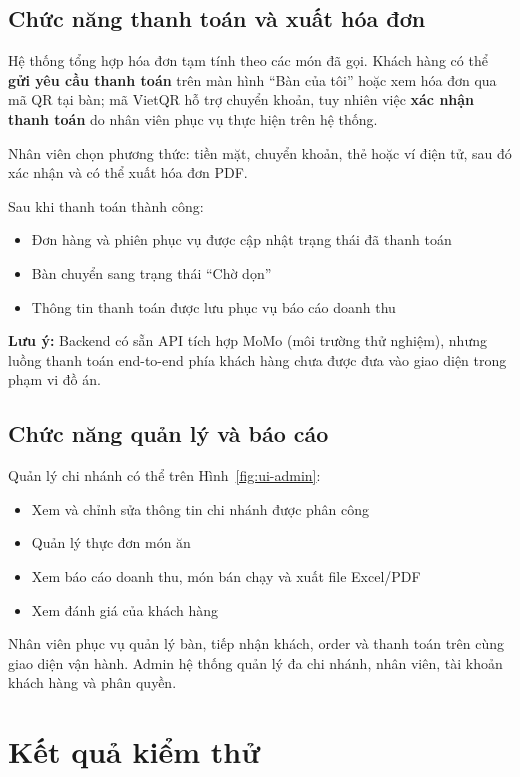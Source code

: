 \documentclass[../DoAn.tex]{subfiles}
\begin{document}
\subsection{Chức năng thanh toán và xuất hóa đơn}

Hệ thống tổng hợp hóa đơn tạm tính theo các món đã gọi.
Khách hàng có thể \textbf{gửi yêu cầu thanh toán} trên màn hình ``Bàn của tôi'' hoặc xem hóa đơn qua mã QR tại bàn; mã VietQR hỗ trợ chuyển khoản, tuy nhiên việc \textbf{xác nhận thanh toán} do nhân viên phục vụ thực hiện trên hệ thống.

Nhân viên chọn phương thức: tiền mặt, chuyển khoản, thẻ hoặc ví điện tử, sau đó xác nhận và có thể xuất hóa đơn PDF.

Sau khi thanh toán thành công:
\begin{itemize}
    \item Đơn hàng và phiên phục vụ được cập nhật trạng thái đã thanh toán
    \item Bàn chuyển sang trạng thái ``Chờ dọn''
    \item Thông tin thanh toán được lưu phục vụ báo cáo doanh thu
\end{itemize}

\textbf{Lưu ý:} Backend có sẵn API tích hợp MoMo (môi trường thử nghiệm), nhưng luồng thanh toán end-to-end phía khách hàng chưa được đưa vào giao diện trong phạm vi đồ án.

\subsection{Chức năng quản lý và báo cáo}

Quản lý chi nhánh có thể trên Hình~\ref{fig:ui-admin}:
\begin{itemize}
    \item Xem và chỉnh sửa thông tin chi nhánh được phân công
    \item Quản lý thực đơn món ăn
    \item Xem báo cáo doanh thu, món bán chạy và xuất file Excel/PDF
    \item Xem đánh giá của khách hàng
\end{itemize}

Nhân viên phục vụ quản lý bàn, tiếp nhận khách, order và thanh toán trên cùng giao diện vận hành.
Admin hệ thống quản lý đa chi nhánh, nhân viên, tài khoản khách hàng và phân quyền.

\section{Kết quả kiểm thử}
\label{section:4.5}
\end{document}
